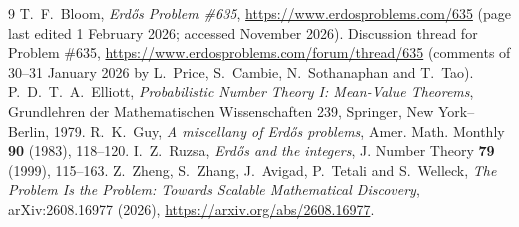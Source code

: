 \documentclass[11pt]{amsart}
\theoremstyle{definition}
\theoremstyle{remark}
\begin{document}
\begin{thebibliography}{9}
 T.~F.~Bloom, \emph{Erd\H{o}s Problem \#635}, \url{https://www.erdosproblems.com/635} (page last edited 1 February 2026; accessed November 2026).
 Discussion thread for Problem \#635, \url{https://www.erdosproblems.com/forum/thread/635} (comments of 30--31 January 2026 by L.~Price, S.~Cambie, N.~Sothanaphan and T.~Tao).
 P.~D.~T.~A.~Elliott, \emph{Probabilistic Number Theory I: Mean-Value Theorems}, Grundlehren der Mathematischen Wissenschaften 239, Springer, New York--Berlin, 1979.
 R.~K.~Guy, \emph{A miscellany of Erd\H{o}s problems}, Amer. Math. Monthly \textbf{90} (1983), 118--120.
 I.~Z.~Ruzsa, \emph{Erd\H{o}s and the integers}, J. Number Theory \textbf{79} (1999), 115--163.
 Z.~Zheng, S.~Zhang, J.~Avigad, P.~Tetali and S.~Welleck, \emph{The Problem Is the Problem: Towards Scalable Mathematical Discovery}, arXiv:2608.16977 (2026), \url{https://arxiv.org/abs/2608.16977}.
\end{thebibliography}
\end{document}
